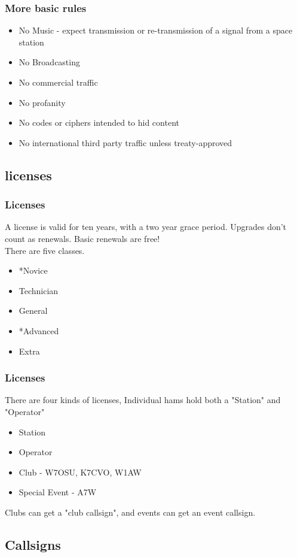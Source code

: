 \documentclass[10pt]{beamer}
\begin{document}
\begin{frame}
\frametitle{More basic rules}
\begin{itemize}
\item No Music - expect transmission or re-transmission of a signal from a space station
\item No Broadcasting
\item No commercial traffic
\item No profanity
\item No codes or ciphers intended to hid content
\item No international third party traffic unless treaty-approved
\end{itemize}
\end{frame}

\subsection{licenses}

\begin{frame}
\frametitle{Licenses}
A license is valid for ten years, with a two year grace period. Upgrades don't count as renewals. Basic renewals are free!\\
There are five classes.
\begin{itemize}
\item *Novice
\item Technician
\item General
\item *Advanced
\item Extra
\end{itemize}
\end{frame}

\begin{frame}
\frametitle{Licenses}
There are four kinds of licenses, Individual hams hold both a "Station" and "Operator"
\begin{itemize}
\item Station
\item Operator
\item Club - W7OSU, K7CVO, W1AW
\item Special Event - A7W
\end{itemize}
Clubs can get a "club callsign", and events can get an event callsign.
\end{frame}

\subsection{Callsigns}
\end{document}

